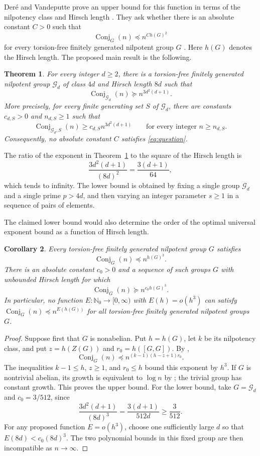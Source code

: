 \documentclass[11pt,letterpaper]{amsart}
\numberwithin{equation}{section}
\newtheorem{theorem}{Theorem}[section]
\newtheorem{corollary}[theorem]{Corollary}
\theoremstyle{remark}
\newcommand{\Conj}{\operatorname{Conj}}
\newcommand{\Gp}{\mathcal G}
\begin{document}
Der\'e and Vandeputte prove an upper bound for this function in terms of
the nilpotency class and Hirsch length \cite[Theorem~A]{DV}. They ask
whether there is an absolute constant $C>0$ such that
\begin{equation}\label{eq:question}
 \Conj_G(n)\preceq n^{C h(G)^2}
\end{equation}
for every torsion-free finitely generated nilpotent group $G$
\cite[Question~1, Section~3.2]{DV}. Here $h(G)$ denotes the Hirsch length.
The proposed main result is the following.

\begin{theorem}\label{thm:main}
For every integer $d\ge2$, there is a torsion-free finitely generated
nilpotent group $\Gp_d$ of class $4d$ and Hirsch length $8d$ such that
\[
 \Conj_{\Gp_d}(n)\succeq n^{3d^2(d+1)}.
\]
More precisely, for every finite generating set $S$ of $\Gp_d$, there
are constants $c_{d,S}>0$ and $n_{d,S}\ge1$ such that
\[
 \Conj_{\Gp_d,S}(n)\ge c_{d,S} n^{3d^2(d+1)}
 \qquad\text{for every integer }n\ge n_{d,S}.
\]
Consequently, no absolute constant $C$ satisfies \eqref{eq:question}.
\end{theorem}

The ratio of the exponent in Theorem~\ref{thm:main} to the square of
the Hirsch length is
\[
 \frac{3d^2(d+1)}{(8d)^2}=\frac{3(d+1)}{64},
\]
which tends to infinity. The lower bound is obtained by fixing a single
group $\Gp_d$ and a single prime $p>4d$, and then varying an integer
parameter $s\ge1$ in a sequence of pairs of elements.

The claimed lower bound would also determine the order of
the optimal universal exponent bound as a function of Hirsch length.

\begin{corollary}\label{cor:envelope}
Every torsion-free finitely generated nilpotent group $G$ satisfies
\[
 \Conj_G(n)\preceq n^{h(G)^3}.
\]
There is an absolute constant $c_0>0$ and a sequence of such groups
$G$ with unbounded Hirsch length for which
\[
 \Conj_G(n)\succeq n^{c_0 h(G)^3}.
\]
In particular, no function $E:\mathbb N_0\to[0,\infty)$ with
$E(h)=o(h^3)$ can satisfy $\Conj_G(n)\preceq n^{E(h(G))}$ for all
torsion-free finitely generated nilpotent groups $G$.
\end{corollary}

\begin{proof}
Suppose first that $G$ is nonabelian. Put $h=h(G)$, let $k$ be its
nilpotency class, and put $z=h(Z(G))$ and $r_0=h([G,G])$.
By \cite[Theorem~A]{DV},
\[
 \Conj_G(n)\preceq n^{(k-1)(h-z+1)r_0}.
\]
The inequalities $k-1\le h$, $z\ge1$, and $r_0\le h$ bound this exponent
by $h^3$. If $G$ is nontrivial abelian, its growth is equivalent to
$\log n$ by \cite[Proposition~2.1.9]{DV}; the trivial group has constant
growth. This proves the upper bound. For the lower bound, take
$G=\Gp_d$ and $c_0=3/512$, since
\[
 \frac{3d^2(d+1)}{(8d)^3}=\frac{3(d+1)}{512d}\ge\frac{3}{512}.
\]
For any proposed function $E=o(h^3)$, choose one sufficiently large
$d$ so that $E(8d)<c_0(8d)^3$. The two polynomial bounds in this fixed
group are then incompatible as $n\to\infty$.
\end{proof}
\end{document}
